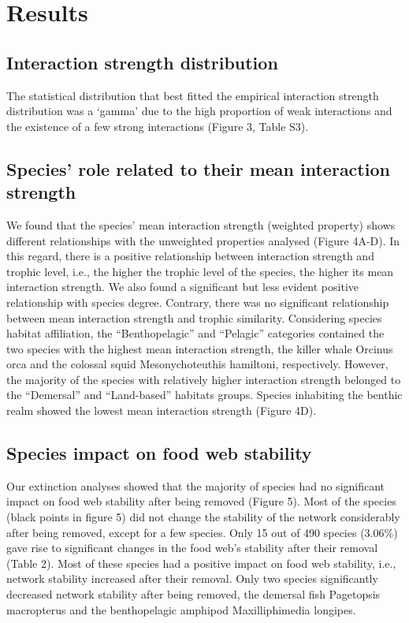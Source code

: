 \documentclass[gc, manuscript]{copernicus}
\begin{document}
\section{Results}

\subsection{Interaction strength distribution}

The statistical distribution that best fitted the empirical interaction
strength distribution was a `gamma' due to the high proportion of weak
interactions and the existence of a few strong interactions (Figure 3,
Table S3).

\subsection{Species' role related to their mean interaction strength}

We found that the species' mean interaction strength (weighted property)
shows different relationships with the unweighted properties analysed
(Figure 4A-D). In this regard, there is a positive relationship between
interaction strength and trophic level, i.e., the higher the trophic
level of the species, the higher its mean interaction strength. We also
found a significant but less evident positive relationship with species
degree. Contrary, there was no significant relationship between mean
interaction strength and trophic similarity. Considering species habitat
affiliation, the ``Benthopelagic'' and ``Pelagic'' categories contained
the two species with the highest mean interaction strength, the killer
whale Orcinus orca and the colossal squid Mesonychoteuthis hamiltoni,
respectively. However, the majority of the species with relatively
higher interaction strength belonged to the ``Demersal'' and
``Land-based'' habitats groups. Species inhabiting the benthic realm
showed the lowest mean interaction strength (Figure 4D).

\subsection{Species impact on food web stability}

Our extinction analyses showed that the majority of species had no
significant impact on food web stability after being removed (Figure 5).
Most of the species (black points in figure 5) did not change the
stability of the network considerably after being removed, except for a
few species. Only 15 out of 490 species (3.06\%) gave rise to
significant changes in the food web's stability after their removal
(Table 2). Most of these species had a positive impact on food web
stability, i.e., network stability increased after their removal. Only
two species significantly decreased network stability after being
removed, the demersal fish Pagetopsis macropterus and the benthopelagic
amphipod Maxilliphimedia longipes.
\end{document}
